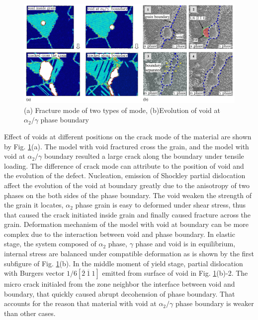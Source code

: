 \documentclass[materials,article,submit,moreauthors,pdftex,10pt,a4paper]{Definitions/mdpi}
\begin{document}
\begin{figure}[ht]
	\centering
	\includegraphics[width=1\linewidth]{"img/void-gb"}
	\caption{(a) Fracture mode of two types of mode,  (b)Evolution of void at $\alpha_2 / \gamma$ phase boundary}
	\label{fig:void-gb}
\end{figure}
Effect of voids at different positions on the crack mode of the material are shown by Fig. \ref{fig:void-gb}(a). The model with void fractured cross the grain, and the model with void at $\alpha_2 / \gamma$ boundary resulted a large crack along the boundary under tensile loading. The difference of crack mode can attribute to the position of void and the evolution of the defect. Nucleation, emission of Shockley partial dislocation affect the evolution of the void at boundary greatly due to the anisotropy of two phases on the both sides of the phase boundary. The void weaken the strength of the grain it locates,  $\alpha_2$ phase grain is easy to deformed under shear stress, thus that caused the crack initiated inside grain and finally caused fracture across the grain. Deformation mechanism of the model with void at boundary can be  more complex due to the interaction between void and phase boundary. In elastic stage, the system composed of $\alpha_2$ phase, $\gamma$ phase and void is in equilibrium, internal stress are balanced under compatible deformation as is shown by the first subfigure of Fig. \ref{fig:void-gb}(b). In the middle moment of yield stage, partial dislocation with Burgers vector $1/6[\overline{2}\ \overline{1}\ 1]$ emitted from surface of void in Fig. \ref{fig:void-gb}(b)-2. The micro crack initialed from the zone neighbor  the interface between void and boundary, that quickly caused abrupt decohension of phase boundary. That accounts for the reason that material with void at $\alpha_2 / \gamma$ phase boundary is weaker than other cases. 
\end{document}

